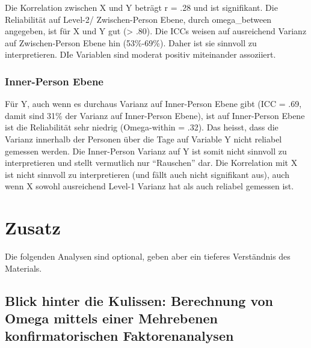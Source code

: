 \documentclass[
  letterpaper,
  DIV=11,
  numbers=noendperiod]{scrreprt}
\begin{document}
\begin{tcolorbox}[enhanced jigsaw, bottomtitle=1mm, coltitle=black, titlerule=0mm, colbacktitle=quarto-callout-tip-color!10!white, colback=white, left=2mm, title=\textcolor{quarto-callout-tip-color}{\faLightbulb}\hspace{0.5em}{Zwischen-Person Ebene}, opacitybacktitle=0.6, arc=.35mm, leftrule=.75mm, toptitle=1mm, rightrule=.15mm, opacityback=0, bottomrule=.15mm, toprule=.15mm, colframe=quarto-callout-tip-color-frame, breakable]

Die Korrelation zwischen X und Y beträgt r = .28 und ist signifikant.
Die Reliabilität auf Level-2/ Zwischen-Person Ebene, durch
omega\_between angegeben, ist für X und Y gut (\textgreater{} .80). Die
ICCs weisen auf ausreichend Varianz auf Zwischen-Person Ebene hin
(53\%-69\%). Daher ist sie sinnvoll zu interpretieren. DIe Variablen
sind moderat positiv miteinander assoziiert.

\subsubsection{Inner-Person Ebene}\label{inner-person-ebene}

Für Y, auch wenn es durchaus Varianz auf Inner-Person Ebene gibt (ICC =
.69, damit sind 31\% der Varianz auf Inner-Person Ebene), ist auf
Inner-Person Ebene ist die Reliabilität sehr niedrig (Omega-within =
.32). Das heisst, dass die Varianz innerhalb der Personen über die Tage
auf Variable Y nicht reliabel gemessen werden. Die Inner-Person Varianz
auf Y ist somit nicht sinnvoll zu interpretieren und stellt vermutlich
nur ``Rauschen'' dar. Die Korrelation mit X ist nicht sinnvoll zu
interpretieren (und fällt auch nicht signifikant aus), auch wenn X
sowohl ausreichend Level-1 Varianz hat als auch reliabel gemessen ist.

\end{tcolorbox}

\section{Zusatz}\label{zusatz}

Die folgenden Analysen sind optional, geben aber ein tieferes
Verständnis des Materials.

\subsection{Blick hinter die Kulissen: Berechnung von Omega mittels
einer Mehrebenen konfirmatorischen
Faktorenanalysen}\label{blick-hinter-die-kulissen-berechnung-von-omega-mittels-einer-mehrebenen-konfirmatorischen-faktorenanalysen}
\end{document}
